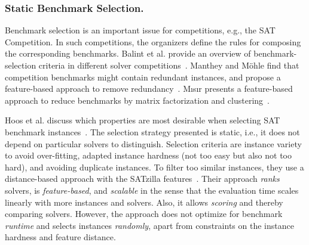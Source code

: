 \documentclass[runningheads]{llncs}
\begin{document}
\subsubsection{Static Benchmark Selection.}

Benchmark selection is an important issue for competitions, e.g., the SAT Competition.
In such competitions, the organizers define the rules for composing the corresponding benchmarks.
Balint et al. provide an overview of benchmark-selection criteria in different solver competitions~\cite{balint2015overview}.
Manthey and Möhle find that competition benchmarks might contain redundant instances, and propose a feature-based approach to remove redundancy~\cite{manthey2016better}.
M{\i}s{\i}r presents a feature-based approach to reduce benchmarks by matrix factorization and clustering~\cite{misir2021benchmark}.

Hoos et al. discuss which properties are most desirable when selecting SAT benchmark instances~\cite{HoosKSS13}.
The selection strategy presented is static, i.e., it does not depend on particular solvers to distinguish.
Selection criteria are instance variety to avoid over-fitting, adapted instance hardness (not too easy but also not too hard), and avoiding duplicate instances.
To filter too similar instances, they use a distance-based approach with the SATzilla features~\cite{XuHHL08,features}.
Their approach \emph{ranks} solvers, is \emph{feature-based}, and \emph{scalable} in the sense that the evaluation time scales linearly with more instances and solvers.
Also, it allows \emph{scoring} and thereby comparing solvers.
However, the approach does not optimize for benchmark \emph{runtime} and selects instances \emph{randomly}, apart from constraints on the instance hardness and feature distance.
\end{document}

